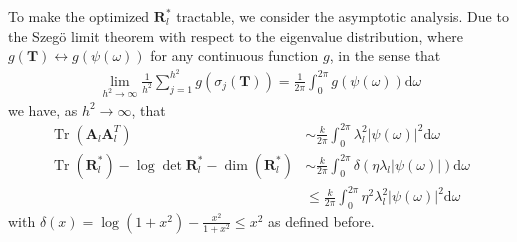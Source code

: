 \documentclass[journal]{IEEEtran} %
\def\mA{{\bm{A}}}
\def\mR{{\bm{R}}}
\def\mT{{\bm{T}}}
\newcommand{\Abs}[1]{|#1|}
\DeclareMathOperator{\Tr}{Tr}
\begin{document}
To make the optimized ${\mR}_l^*$ tractable, we consider the asymptotic analysis. 
%
Due to the Szeg\"{o} limit theorem with respect to  the eigenvalue distribution, where $g(\mT) \leftrightarrow g(\psi(\omega))$ for any continuous function $g$, in the sense that \cite{gray2006toeplitz}
\begin{align}
    \lim_{h^2 \to \infty} \frac{1}{h^2}\sum_{j=1}^{h^2} g(\sigma_j(\mT)) = \frac{1}{2\pi} \int_{0}^{2\pi} g(\psi(\omega)) \mathrm{d}\omega
\end{align}
we have, as $h^2 \to \infty$, that
\begin{align}
\Tr({\mA}_l {\mA}_l^T) &\sim \frac{k}{2\pi}\int_{0}^{2\pi} \lambda_l^2 \Abs{\psi(\omega)}^2 \mathrm{d} \omega  \\
    \Tr(\mR_l^*)  - \log \det \mR_l^* - \dim(\mR_l^*) &\sim \frac{k}{2\pi}\int_{0}^{2\pi}  \delta({\eta}{\lambda}_l \Abs{\psi(\omega)}) \mathrm{d} \omega\\
    &\le \frac{k}{2\pi}\int_{0}^{2\pi}  {\eta}^2{\lambda}_l^2 \Abs{\psi(\omega)}^2 \mathrm{d} \omega
\end{align}
with $\delta(x)=\log(1+x^2)-\frac{x^2}{1+x^2} \le x^2$ as defined before.
\end{document}
